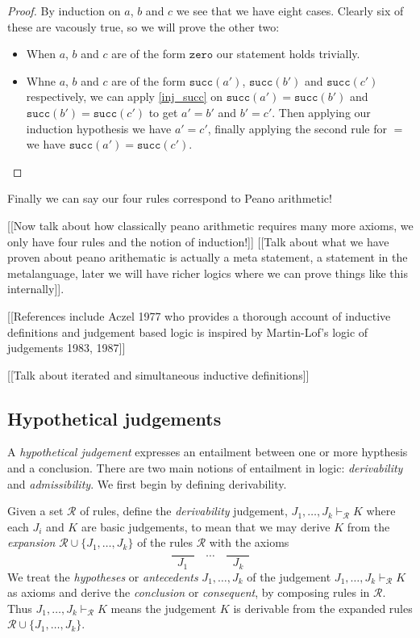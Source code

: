 \begin{proof}
    By induction on $a$, $b$ and $c$ we see that we have eight cases. Clearly six of these are vacously true, so we will prove the other two:
    \begin{itemize}
        \item When $a$, $b$ and $c$ are of the form $\texttt{zero}$ our statement holds trivially.
        \item Whne $a$, $b$ and $c$ are of the form $\texttt{succ}(a')$, $\texttt{succ}(b')$ and $\texttt{succ}(c')$ respectively, we can apply \ref{inj_succ} on $\texttt{succ}(a') =\texttt{succ}(b')$ and $\texttt{succ}(b') = \texttt{succ}(c')$ to get $a' = b'$ and $b' = c'$. Then applying our induction hypothesis we have $a' = c'$, finally applying the second rule for $=$ we have $\texttt{succ}(a') =\texttt{succ}(c')$.
    \end{itemize}
\end{proof}

Finally we can say our four rules correspond to Peano arithmetic!

[[Now talk about how classically peano arithmetic requires many more axioms, we only have four rules and the notion of induction!]]
[[Talk about what we have proven about peano arithematic is actually a meta statement, a statement in the metalanguage, later we will have richer logics where we can prove things like this internally]].

[[References include Aczel 1977 who provides a thorough account of inductive definitions and judgement based logic is inspired by Martin-Lof's logic of judgements 1983, 1987]]

[[Talk about iterated and simultaneous inductive definitions]]

\subsection{Hypothetical judgements}

A \emph{hypothetical judgement} expresses an entailment between one or more hypthesis and a conclusion. There are two main notions of entailment in logic: \emph{derivability} and \emph{admissibility}. We first begin by defining derivability.

\begin{defin}
    Given a set $\mathcal{R}$ of rules, define the \emph{derivability} judgement, $J_1,\dots,J_k \vdash_{\mathcal{R}} K$ where each $J_i$ and $K$ are basic judgements, to mean that we may derive $K$ from the \emph{expansion} $\mathcal{R} \cup \{ J_1, \dots, J_k \}$ of the rules $\mathcal{R}$ with the axioms
    $$
        \frac{\qquad}{J_1} \quad \cdots \quad \frac{\qquad}{J_k}
    $$
    We treat the \emph{hypotheses} or \emph{antecedents} $J_1, \dots, J_k$ of the judgement $J_1,\dots,J_k \vdash_{\mathcal{R}} K$ as axioms and derive the \emph{conclusion} or \emph{consequent}, by composing rules in $\mathcal{R}$. Thus $J_1,\dots,J_k \vdash_{\mathcal{R}} K$ means the judgement $K$ is derivable from the expanded rules $\mathcal{R} \cup \{ J_1, \dots, J_k \}$.
\end{defin}

